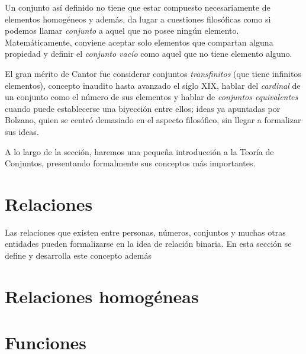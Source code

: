 Un conjunto así definido no tiene que estar compuesto necesariamente
de elementos homogéneos y además, da lugar a cuestiones filosóficas como 
si podemos llamar \textit{conjunto} a aquel que no posee ningún elemento. 
Matemáticamente, conviene aceptar solo elementos que compartan alguna 
propiedad y definir el \textit{conjunto vacío} como aquel que no tiene 
elemento alguno.

El gran mérito de Cantor fue considerar conjuntos \textit{transfinitos} 
(que tiene infinitos elementos), concepto inaudito hasta avanzado el siglo 
XIX, hablar del \textit{cardinal} de un conjunto como el número de sus
elementos y hablar de \textit{conjuntos equivalentes} cuando puede
establecerse una biyección entre ellos; ideas ya apuntadas por Bolzano,
quien se centró demasiado en el aspecto filosófico, sin llegar a formalizar
sus ideas.

A lo largo de la sección, haremos una pequeña introducción a la Teoría de 
Conjuntos, presentando formalmente sus conceptos más importantes.




\section{Relaciones}

Las relaciones que existen entre personas, números, conjuntos y muchas
otras entidades pueden formalizarse en la idea de relación binaria. En esta 
sección se define y desarrolla este concepto además 


\section{Relaciones homogéneas}


\section{Funciones}


